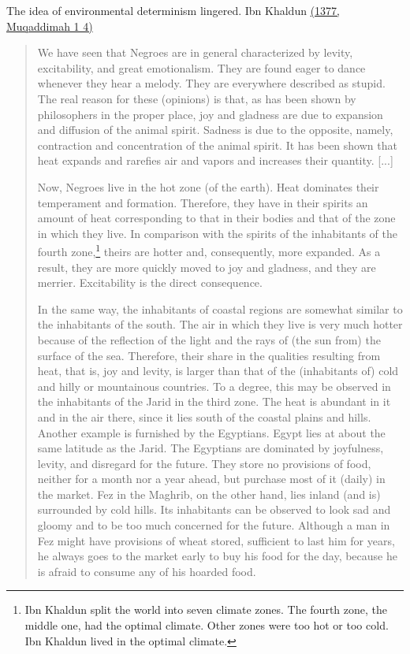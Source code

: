 The idea of environmental determinism lingered. Ibn Khaldun \href{http://www.muslimphilosophy.com/ik/Muqaddimah/Chapter1/Ch_1_04.htm}{(1377, Muqaddimah 1 4)}
\begin{quote}
We have seen that Negroes are in general characterized by levity, excitability, and great emotionalism. They are found eager to dance whenever they hear a melody. They are everywhere described as stupid. The real reason for these (opinions) is that, as has been shown by philosophers in the proper place, joy and gladness are due to expansion and diffusion of the animal spirit. Sadness is due to the opposite, namely, contraction and concentration of the animal spirit. It has been shown that heat expands and rarefies air and vapors and increases their quantity. [...]

Now, Negroes live in the hot zone (of the earth). Heat dominates their
temperament and formation. Therefore, they have in their spirits an amount of heat corresponding to that in their bodies and that of the zone in which they live. In comparison with the spirits of the inhabitants of the fourth zone,\footnote{Ibn Khaldun split the world into seven climate zones. The fourth zone, the middle one, had the optimal climate. Other zones were too hot or too cold. Ibn Khaldun lived in the optimal climate.} theirs are hotter and, consequently, more expanded. As a result, they are more quickly moved to joy and gladness, and they are merrier. Excitability is the direct consequence.

In the same way, the inhabitants of coastal regions are somewhat similar to the inhabitants of the south. The air in which they live is very much hotter because of the reflection of the light and the rays of (the sun from) the surface of the sea. Therefore, their share in the qualities resulting from heat, that is, joy and levity, is larger than that of the (inhabitants of) cold and hilly or mountainous countries. To a degree, this may be observed in the inhabitants of the Jarid in the third zone. The heat is abundant in it and in the air there, since it lies south of the coastal plains and hills. Another example is furnished by the Egyptians. Egypt lies at about the same latitude as the Jarid. The Egyptians are dominated by joyfulness, levity, and disregard for the future. They store no provisions of food, neither for a month nor a year ahead, but purchase most of it (daily) in the market. Fez in the Maghrib, on the other hand, lies inland (and is) surrounded by cold hills. Its inhabitants can be observed to look sad and gloomy and to be too much concerned for the future. Although a man in Fez might have provisions of wheat stored, sufficient to last him for years, he always goes to the market early to buy his food for the day, because he is afraid to consume any of his hoarded food.


\end{quote}

